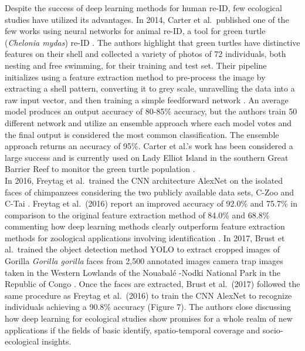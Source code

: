 \documentclass[11pt]{article}
\begin{document}
Despite the success of deep learning methods for human re-ID, few ecological studies have utilized its advantages. In 2014, Carter et al.\ published one of the few works using neural networks for animal re-ID, a tool for green turtle (\textit{Chelonia mydas}) re-ID \cite{carter2014automated}. The authors highlight that green turtles have distinctive features on their shell and collected a variety of photos of 72 individuals, both nesting and free swimming, for their training and test set. Their pipeline initializes using a feature extraction method to pre-process the image by extracting a shell pattern, converting it to grey scale, unravelling the data into a raw input vector, and then training a simple feedforward network \cite{carter2014automated}. An average model produces an output accuracy of 80-85\% accuracy, but the authors train 50 different network and utilize an ensemble approach where each model votes and the final output is considered the most common classification. The ensemble approach returns an accuracy of 95\%. Carter et al.'s work has been considered a large success and is currently used on Lady Elliot Island in the southern Great Barrier Reef to monitor the green turtle population \cite{carter2014automated}. 
\newline
\\
In 2016, Freytag et al.\ trained the CNN architecture AlexNet on the isolated faces of chimpanzees considering the two publicly available data sets, C-Zoo and C-Tai \cite{freytag2016chimpanzee}. Freytag et al.\ (2016) report an improved accuracy of 92.0\% and 75.7\% in comparison to the original feature extraction method of 84.0\% and 68.8\% commenting how deep learning methods clearly outperform feature extraction methods for zoological applications involving identification \cite{freytag2016chimpanzee, loos2013automated}. In 2017, Brust et al.\ trained the object detection method YOLO to extract cropped images of Gorilla \textit{Gorilla gorilla} faces from 2,500 annotated images camera trap images taken in the Western Lowlands of the Nouabal\'e -Nodki National Park in the Republic of Congo \cite{brust2017towards}. Once the faces are extracted, Brust et al.\ (2017) followed the same procedure as Freytag et al.\ (2016) to train the CNN AlexNet to recognize individuals achieving a 90.8\% accuracy \cite{freytag2016chimpanzee, brust2017towards} (Figure 7). The authors close discussing how deep learning for ecological studies show promises for a whole realm of new applications if the fields of basic identify, spatio-temporal coverage and socio-ecological insights. \cite{freytag2016chimpanzee, brust2017towards}
\newline
\end{document}
